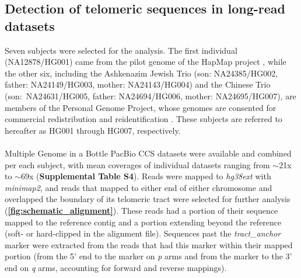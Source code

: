 \documentclass{article}
\begin{document}
\subsection*{Detection of telomeric sequences in long-read datasets}
    Seven subjects were selected for the analysis.
    The first individual (NA12878/HG001) came from the pilot genome of the HapMap project \parencite{HG001},
    while the other six,
        including
            the Ashkenazim Jewish Trio (son: NA24385/HG002, father: NA24149/HG003, mother: NA24143/HG004)
            and the Chinese Trio \\%
            (\mbox{son: NA24631/HG005}, father: NA24694/HG006, mother: NA24695/HG007),
        are members of the Personal Genome Project,
            whose genomes are consented for commercial redistribution and reidentification \parencite{HG00X}.
    These subjects are referred to hereafter as HG001 through HG007, respectively.
    \\~\\
    Multiple Genome in a Bottle \parencite{giab} PacBio CCS \parencite{pacbio,pacbioccs} datasets were available and combined per each subject,
        with mean coverages of individual datasets ranging from $\sim$21x to $\sim$69x (\textbf{Supplemental Table S4}).
    Reads were mapped to \textit{hg38ext} with \textit{minimap2},
        and reads that mapped to either end of either chromosome and overlapped the boundary of its telomeric tract
        were selected for further analysis (\textbf{\autoref{fig:schematic_alignment}}).
    These reads had a portion of their sequence mapped to the reference contig and a portion extending beyond the reference
        (soft- or hard-clipped in the alignment file).
    Sequences past the \textit{tract\_anchor} marker were extracted from the reads that had this marker within their mapped portion
        (from the 5' end to the marker on \textit{p} arms and from the marker to the 3' end on \textit{q} arms,
        accounting for forward and reverse mappings).
\end{document}
